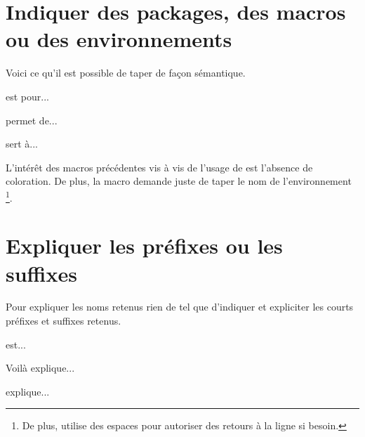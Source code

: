 


\usepackage[lang = FR]{../main/main}
\usepackage{../listing/listing}
\usepackage{../rem-exa/rem-exa}


\usepackage{macroenv}




\section{Indiquer des packages, des macros ou des environnements}

Voici ce qu'il est possible de taper de façon sémantique.

\begin{bdoclatex}
 est pour...

 permet de...

 sert à...
\end{bdoclatex}


\begin{bdocrem}
    L'intérêt des macros précédentes vis à vis de l'usage de  est l'absence de coloration.
    De plus, la macro  demande juste de taper le nom de l'environnement
    \footnote{
        De plus,  utilise des espaces pour autoriser des retours à la ligne si besoin.
    }.
\end{bdocrem}




\section{Expliquer les préfixes ou les suffixes}

Pour expliquer les noms retenus rien de tel que d'indiquer et expliciter les courts préfixes et suffixes retenus.

\begin{bdoclatex}
 est...

Voilà  explique...

 explique...
\end{bdoclatex}




